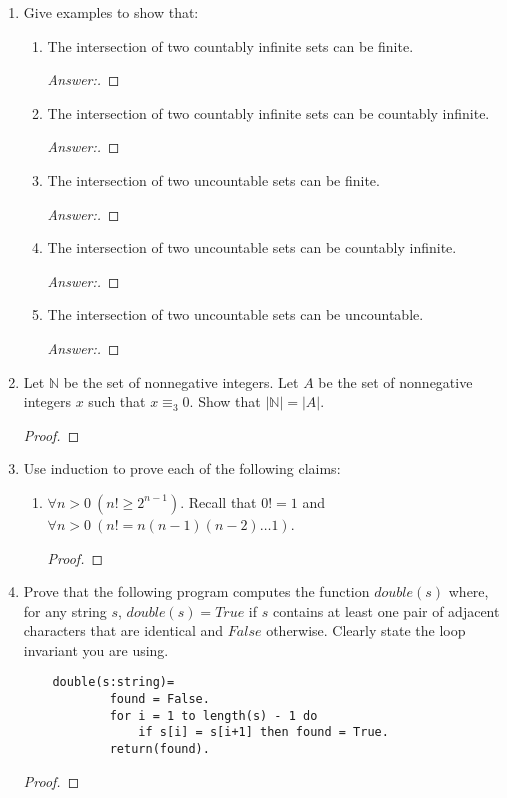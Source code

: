 \documentclass[10pt]{article}
\newcommand{\card}[1]{\left| #1 \right|}
\newcommand{\nat}{\mathbb{N}}
\begin{document}
\begin{enumerate}

\item
Give examples to show that:
\begin{enumerate}
\item
The intersection of two countably infinite sets can be finite.
\begin{proof}[Answer:]
\end{proof}
\item
The intersection of two countably infinite sets can be countably infinite.
\begin{proof}[Answer:]
\end{proof}
\item
The intersection of two uncountable sets can be finite.
\begin{proof}[Answer:]
\end{proof}
\item
The intersection of two uncountable sets can be countably infinite.
\begin{proof}[Answer:]
\end{proof}
\item
The intersection of two uncountable sets can be uncountable.
\begin{proof}[Answer:]
\end{proof}
\end{enumerate}



\addtocounter{enumi}{2}
\item
Let $\nat$ be the set of nonnegative integers.  Let $A$ be the set of nonnegative integers $x$ such that $x \equiv _3 0$.  Show that $\card{\nat} = \card{A}$.
\begin{proof}
\end{proof}



\addtocounter{enumi}{3}
\item
Use induction to prove each of the following claims:
\begin{enumerate}
\addtocounter{enumii}{1}
\item
$\forall n > 0 \> (n! \geq 2^{n-1})$.  Recall that $0! = 1$ and $\forall n > 0 \> (n! = n(n-1)(n-2) \ldots 1)$.
\begin{proof}
\end{proof}
\end{enumerate}


\addtocounter{enumi}{2}
\item
Prove that the following program computes the function $double(s)$ where, for any string $s$, $double(s) = True$ if $s$ contains at least one pair of adjacent characters that are identical and $False$ otherwise.  Clearly state the loop invariant you are using.
\begin{verbatim}
    double(s:string)=
            found = False.
            for i = 1 to length(s) - 1 do
                if s[i] = s[i+1] then found = True.
            return(found).
\end{verbatim}
\begin{proof}
\end{proof}
\end{enumerate}
\end{document}
